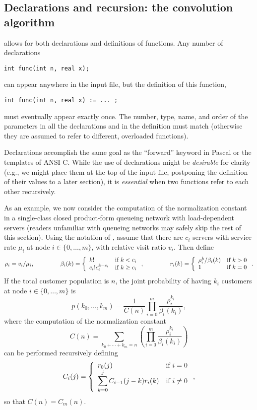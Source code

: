 \subsection{Declarations and recursion: the convolution algorithm}

{\smart} allows for both declarations and definitions of functions.
Any number of declarations
\begin{lstlisting}
int func(int n, real x);
\end{lstlisting}
can appear anywhere in the input file, but the definition of this function,
\begin{lstlisting}
int func(int n, real x) := ... ;
\end{lstlisting}
must eventually appear exactly once.
The number, type, name, and order of the parameters in all the
declarations and in the definition must match (otherwise they are
assumed to refer to different, overloaded functions).

Declarations accomplish the same goal as the ``forward'' keyword in
Pascal or the templates of ANSI C.
While the use of declarations might be \emph{desirable} for clarity
(e.g., we might place them at the top of the input file,
postponing the definition of their values to a later section), it is
\emph{essential} when two functions refer to each other recursively.

As an example, we now consider the computation of the
normalization constant in a single-class closed product-form queueing
network with load-dependent servers
\cite{Jain1991} (readers unfamiliar with queueing networks may safely
skip the rest of this section).
Using the notation of
\cite{Trivedi2002book}, assume that there are $c_i$ servers with service
rate $\mu_i$ at node $i \in \{0, \ldots, m\}$, with relative visit
ratio $v_i$.  Then define
$$
   \rho_i = v_i / \mu_i ,  ~~~~~~~~~~~~~
\beta_i(k) = \left\{ \begin{array}{l l}
   k!             & \mbox{if $k < c_i$} \\
   c_i!c_i^{k-c_i} & \mbox{if $k \geq c_i$}
               \end{array}\right. , %
  ~~~~~~~~~~~~~
r_i(k) = \left\{ \begin{array}{l l}
   \rho_i^k / \beta_i(k)             & \mbox{if $k > 0$} \\
   1                                 & \mbox{if $k = 0$}
               \end{array}\right. . %
$$
If the total customer population is $n$, the joint probability of
having $k_i$ customers at node $i \in \{0, \ldots, m\}$ is
$$p(k_0, \ldots, k_m) = \frac{1}{C(n)} \prod_{i=0}^{m}
  \frac{\rho_i^{k_i}}{\beta_i(k_i)} ,$$
where the computation of the normalization constant
$$C(n) = \sum_{k_0+\cdots+k_m = n}\left( \prod_{i=0}^{m}
  \frac{\rho_i^{k_i}}{\beta_i(k_i)} \right) $$
can be performed recursively defining
$$
C_i(j) = \left\{ \begin{array}{l l}
   r_0(j)             & \mbox{if $i = 0$} \\
   \displaystyle \sum_{k=0}^j C_{i-1}(j-k) r_i(k) & \mbox{if $i \neq 0$}
               \end{array}\right. , %
$$
so that $C(n) = C_m(n)$.

